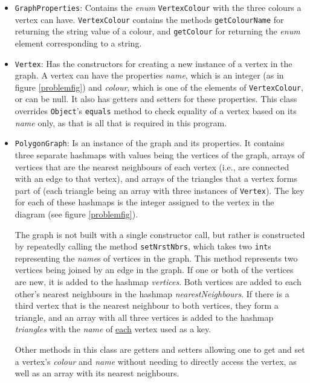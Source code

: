 \documentclass[letterpaper,10pt]{article}
\def\code#1{\texttt{#1}}
\begin{document}
\begin{itemize}
 \item \code{GraphProperties}:  Contains the \textit{enum} \code{VertexColour} with the three colours a vertex can have.  
 \code{VertexColour} contains the methods \code{getColourName} for returning the string value of a colour, and \code{getColour} for returning 
 the \textit{enum} element corresponding to a string.
 
 \item \code{Vertex}: Has the constructors for creating a new instance of a vertex in the graph.  A vertex can have the properties \textit{name}, 
 which is an integer (as in figure \ref{problemfig}) and \textit{colour}, which is one of the elements of \code{VertexColour}, or can be null.  
 It also has getters and setters for these properties.  This class overrides \code{Object}'s \code{equals} method to check equality of a vertex 
 based on its \textit{name} only, as that is all that is required in this program.
 
 \item \code{PolygonGraph}: Is an instance of the graph and its properties.  It contains three separate hashmaps with values being the vertices of the graph, 
 arrays of vertices that are the nearest neighbours of each vertex (i.e., are connected with an edge to that vertex), and arrays of the triangles 
 that a vertex forms part of (each triangle being an array with three instances of \code{Vertex}).  
 The key for each of these hashmaps is the integer assigned to the vertex in the diagram (see figure \ref{problemfig}).
 
 The graph is not built with a single constructor call, but rather is constructed by repeatedly calling the method \code{setNrstNbrs}, which takes 
 two \code{int}s representing the \textit{name}s of vertices in the graph.   This method represents two vertices being joined by an edge in the graph.
 If one or both of the vertices are new, it is added to the hashmap \textit{vertices}.  Both vertices are added to each other's nearest neighbours 
 in the hashmap \textit{nearestNeighbours}.  If there is a third vertex that is the nearest neighbour to both vertices, they form a triangle, and 
 an array with all three vertices is added to the hashmap \textit{triangles} with the \textit{name} of \underline{each} vertex used as a key. 
 
 Other methods in this class are getters and setters allowing one to get and set a vertex's \textit{colour} and \textit{name} without 
 needing to directly access the vertex, as well as an array with its nearest neighbours.
 

\end{itemize}
\end{document}
